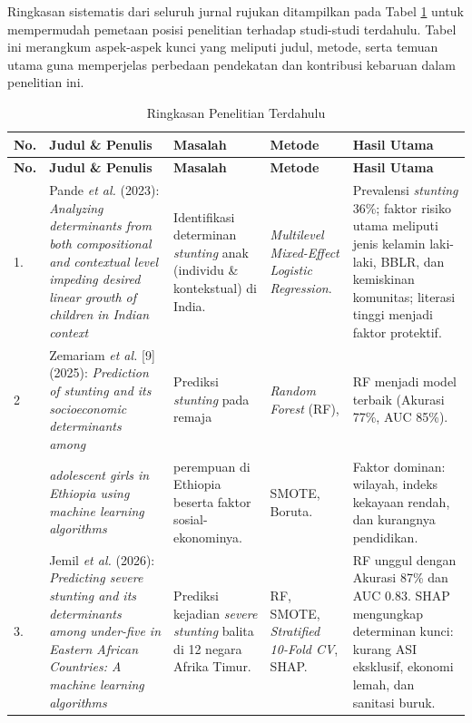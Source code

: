Ringkasan sistematis dari seluruh jurnal rujukan ditampilkan pada Tabel \ref{tab:tinjauan_pustaka} untuk mempermudah pemetaan posisi penelitian terhadap studi-studi terdahulu. Tabel ini merangkum aspek-aspek kunci yang meliputi judul, metode, serta temuan utama guna memperjelas perbedaan pendekatan dan kontribusi kebaruan dalam penelitian ini.
\begin{longtable}{|p{}|p{}|p{}|p{}|p{}|}
    \caption{Ringkasan Penelitian Terdahulu}
    \label{tab:tinjauan_pustaka}\\
    \hline
    \textbf{No.} & \textbf{Judul \& Penulis} & \textbf{Masalah} & \textbf{Metode} & \textbf{Hasil Utama} \\
    \hline
    \endfirsthead

    \hline
    \textbf{No.} & \textbf{Judul \& Penulis} & \textbf{Masalah} & \textbf{Metode} & \textbf{Hasil Utama} \\
    \hline
    \endhead

    \hline
    \endfoot

    \hline
    \endlastfoot

    1. & Pande \textit{et al.} \cite{pande_indian_stunting_2023} (2023): \textit{Analyzing determinants from both compositional and contextual level impeding desired linear growth of children in Indian context} & Identifikasi determinan \textit{stunting} anak (individu \& kontekstual) di India. & \textit{Multilevel Mixed-Effect Logistic Regression}. & Prevalensi \textit{stunting} 36\%; faktor risiko utama meliputi jenis kelamin laki-laki, BBLR, dan kemiskinan komunitas; literasi tinggi menjadi faktor protektif. \\ 
    \hline

    2 & Zemariam \textit{et al.} [9] (2025): \textit{Prediction of stunting and its socioeconomic determinants among} & Prediksi \textit{stunting} pada remaja & \textit{Random Forest} (RF), & RF menjadi model terbaik (Akurasi 77\%, AUC 85\%). \\

    & \textit{adolescent girls in Ethiopia using machine learning algorithms} & perempuan di Ethiopia beserta faktor sosial-ekonominya. & SMOTE, Boruta. & Faktor dominan: wilayah, indeks kekayaan rendah, dan kurangnya pendidikan. \\
    \hline

    3. & Jemil \textit{et al.} \cite{jemil2026predicting} (2026): \textit{Predicting severe stunting and its determinants among under-five in Eastern African Countries: A machine learning algorithms} & Prediksi kejadian \textit{severe stunting} balita di 12 negara Afrika Timur. & RF, SMOTE, \textit{Stratified 10-Fold CV}, SHAP. & RF unggul dengan Akurasi 87\% dan AUC 0.83. SHAP mengungkap determinan kunci: kurang ASI eksklusif, ekonomi lemah, dan sanitasi buruk. \\ 
    \hline


\end{longtable}
